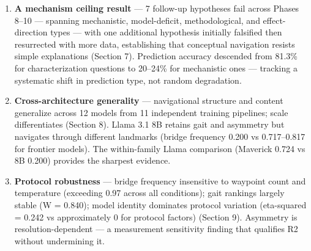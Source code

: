 \begin{enumerate}
  \begin{itemize}
  \tightlist
  \item
    Models have characteristic conceptual gaits spanning a 2.9x range {[}robust{]} R1.
  \item
    Navigation is consistent with quasimetric structure: systematically asymmetric (mean 0.811) with the triangle inequality holding at approximately 91\% {[}robust{]} R2.
  \item
    Polysemy sense differentiation is genuine, with cross-pair Jaccard of 0.011-0.062 for different senses {[}robust{]} R3.
  \item
    Hierarchical paths are compositional with 4.9x higher transitivity than random controls {[}robust{]} R4.
  \item
    Control validation supports the paradigm, though stapler-monsoon fails strict criteria for all 12 models {[}robust, qualified{]} R5.
  \item
    Bridge concepts function as structural bottlenecks with frequencies exceeding 0.97 under robustness testing {[}robust{]} R6.
  \item
    Cue-strength gradient exists: 12/16 family-model combinations show monotonic decrease {[}robust{]} R7.
  \item
    R3, R4, and R7 are untested beyond the original 4-model cohort.
  \end{itemize}
\item
  \textbf{A mechanism ceiling result} --- 7 follow-up hypotheses fail across Phases 8--10 --- spanning mechanistic, model-deficit, methodological, and effect-direction types --- with one additional hypothesis initially falsified then resurrected with more data, establishing that conceptual navigation resists simple explanations (Section 7). Prediction accuracy descended from 81.3\% for characterization questions to 20--24\% for mechanistic ones --- tracking a systematic shift in prediction type, not random degradation.
\item
  \textbf{Cross-architecture generality} --- navigational structure and content generalize across 12 models from 11 independent training pipelines; scale differentiates (Section 8). Llama 3.1 8B retains gait and asymmetry but navigates through different landmarks (bridge frequency 0.200 vs 0.717--0.817 for frontier models). The within-family Llama comparison (Maverick 0.724 vs 8B 0.200) provides the sharpest evidence.
\item
  \textbf{Protocol robustness} --- bridge frequency insensitive to waypoint count and temperature (exceeding 0.97 across all conditions); gait rankings largely stable (W = 0.840); model identity dominates protocol variation (eta-squared = 0.242 vs approximately 0 for protocol factors) (Section 9). Asymmetry is resolution-dependent --- a measurement sensitivity finding that qualifies R2 without undermining it.

\end{enumerate}
